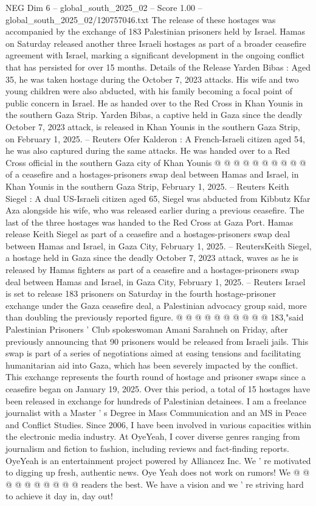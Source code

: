 \begin{textsample}{NEG Dim 6 – global\_south\_2025\_02 – Score 1.00 – global\_south\_2025\_02/120757046.txt}  \label{ex:f6_neg_045}
The release of these hostages was accompanied by the exchange of 183 Palestinian prisoners held by Israel.
Hamas on Saturday released another three Israeli hostages as part of a broader ceasefire agreement with Israel, marking a significant development in the ongoing conflict that has persisted for over 15 months.
Details of the Release Yarden Bibas : Aged 35, he was taken hostage during the October 7, 2023 attacks.
His wife and two young children were also abducted, with his family becoming a focal point of public concern in Israel.
He as handed over to the Red Cross in Khan Younis in the southern Gaza Strip.
Yarden Bibas, a captive held in Gaza since the deadly October 7, 2023 attack, is released in Khan Younis in the southern Gaza Strip, on February 1, 2025. -- Reuters Ofer Kalderon : A French-Israeli citizen aged 54, he was also captured during the same attacks.
He was handed over to a Red Cross official in the southern Gaza city of Khan Younis @ @ @ @ @ @ @ @ @ @ of a ceasefire and a hostages-prisoners swap deal between Hamas and Israel, in Khan Younis in the southern Gaza Strip, February 1, 2025. -- Reuters Keith Siegel : A dual US-Israeli citizen aged 65, Siegel was abducted from Kibbutz Kfar Aza alongside his wife, who was released earlier during a previous ceasefire.
The last of the three hostages was handed to the Red Cross at Gaza Port.
Hamas release Keith Siegel as part of a ceasefire and a hostages-prisoners swap deal between Hamas and Israel, in Gaza City, February 1, 2025. -- ReutersKeith Siegel, a hostage held in Gaza since the deadly October 7, 2023 attack, waves as he is released by Hamas fighters as part of a ceasefire and a hostages-prisoners swap deal between Hamas and Israel, in Gaza City, February 1, 2025. -- Reuters Israel is set to release 183 prisoners on Saturday in the fourth hostage-prisoner exchange under the Gaza ceasefire deal, a Palestinian advocacy group said, more than doubling the previously reported figure. @ @ @ @ @ @ @ @ @ @ 183,"said Palestinian Prisoners ' Club spokeswoman Amani Sarahneh on Friday, after previously announcing that 90 prisoners would be released from Israeli jails.
This swap is part of a series of negotiations aimed at easing tensions and facilitating humanitarian aid into Gaza, which has been severely impacted by the conflict.
This exchange represents the fourth round of hostage and prisoner swaps since a ceasefire began on January 19, 2025.
Over this period, a total of 15 hostages have been released in exchange for hundreds of Palestinian detainees.
I am a freelance journalist with a Master ' s Degree in Mass Communication and an MS in Peace and Conflict Studies.
Since 2006, I have been involved in various capacities within the electronic media industry.
At OyeYeah, I cover diverse genres ranging from journalism and fiction to fashion, including reviews and fact-finding reports.
OyeYeah is an entertainment project powered by Alliancez Inc.
We ' re motivated to digging up fresh, authentic news.
Oye Yeah does not work on rumors!
We @ @ @ @ @ @ @ @ @ @ readers the best.
We have a vision and we ' re striving hard to achieve it day in, day out!

\end{textsample}
